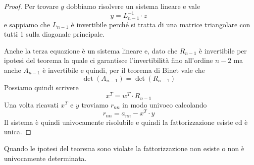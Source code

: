 \begin{theorem}
\begin{proof}
		Per trovare $y$ dobbiamo risolvere un sistema lineare e vale
		\[ y = L_{n-1}^{-1} \cdot z \]
		e sappiamo che $L_{n-1}$ è invertibile perché si tratta di una matrice triangolare con tutti 1 sulla
		diagonale principale.

		Anche la terza equazione è un sistema lineare e, dato che $R_{n-1}$ è invertibile per ipotesi del teorema
		la quale ci garantisce l'invertibilità fino all'ordine $n-2$ ma anche $A_{n-1}$ è invertibile e quindi,
		per il teorema di Binet vale che
		\[ \det(A_{n-1}) = \det(R_{n-1}) \]
		Possiamo quindi scrivere
		\[ x^T = w^T \cdot R_{n-1} \]
		Una volta ricavati $x^T$ e $y$ troviamo $r_{nn}$ in modo univoco calcolando
		\[ r_{nn} = a_{nn} - x^T \cdot y \]
		Il sistema è quindi univocamente risolubile e quindi la fattorizzazione esiste ed è unica.
	\end{proof}
	Quando le ipotesi del teorema sono violate la fattorizzazione non esiste o non è univocamente determinata.
\end{theorem}
